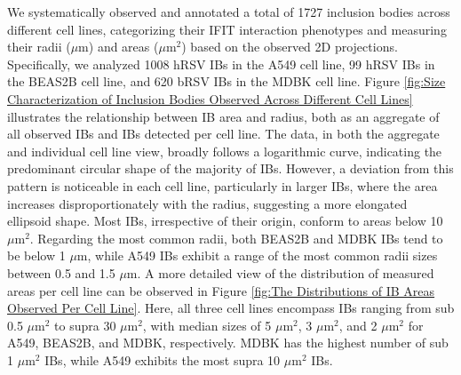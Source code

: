 We systematically observed and annotated a total of 1727 inclusion bodies  across different cell lines, categorizing their IFIT interaction phenotypes and measuring their radii (\(\mu \mbox{m}\)) and areas (\(\mu \mbox{m}^2\)) based on the observed 2D projections. Specifically, we analyzed 1008 hRSV IBs in the A549 cell line, 99 hRSV IBs in the BEAS2B cell line, and 620 bRSV IBs in the MDBK cell line. Figure \ref{fig:Size Characterization of Inclusion Bodies Observed Across Different Cell Lines} illustrates the relationship between IB area and radius, both as an aggregate of all observed IBs and IBs detected per cell line. The data, in both the aggregate and individual cell line view, broadly follows a logarithmic curve, indicating the predominant circular shape of the majority of IBs. However, a deviation from this pattern is noticeable in each cell line, particularly in larger IBs, where the area increases disproportionately with the radius, suggesting a more elongated ellipsoid shape. Most IBs, irrespective of their origin, conform to areas below 10 \(\mu \mbox{m}^2\). Regarding the most common radii, both BEAS2B and MDBK IBs tend to be below 1 \(\mu \mbox{m}\), while A549 IBs exhibit a range of the most common radii sizes between 0.5 and 1.5 \(\mu \mbox{m}\). A more detailed view of the distribution of measured areas per cell line can be observed in Figure \ref{fig:The Distributions of IB Areas Observed Per Cell Line}. Here, all three cell lines encompass IBs ranging from sub 0.5 \(\mu \mbox{m}^2\) to supra 30 \(\mu \mbox{m}^2\), with median sizes of 5 \(\mu \mbox{m}^2\), 3 \(\mu \mbox{m}^2\), and 2 \(\mu \mbox{m}^2\) for A549, BEAS2B, and MDBK, respectively. MDBK has the highest number of sub 1 \(\mu \mbox{m}^2\) IBs, while A549 exhibits the most supra 10 \(\mu \mbox{m}^2\) IBs.

